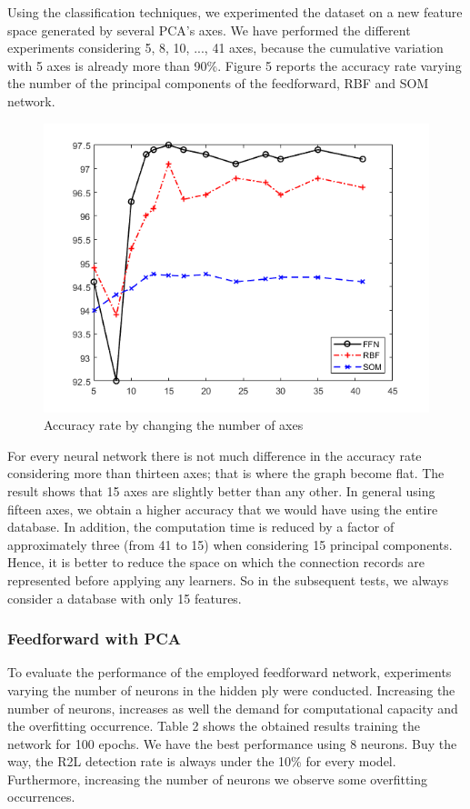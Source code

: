 \documentclass[twocolumn,11pt]{asme2ej}
\begin{document}
Using the classification techniques, we experimented the dataset on a new feature space generated by several PCA's axes. We have performed the different experiments considering 5, 8, 10, ..., 41 axes, because the cumulative variation with 5 axes is already more than 90\%. Figure 5 reports the accuracy rate varying the number of the principal components of the feedforward, RBF and SOM network.
\begin{figure}[h]
\centering
\includegraphics[scale=0.52]{PCA_RBF.png}
\caption{Accuracy rate by changing the number of axes}
\end{figure}
For every neural network there is not much difference in the accuracy rate considering more than thirteen axes; that is where the graph become flat. The result shows that 15 axes are slightly better than any other. In general using fifteen axes, we obtain a higher accuracy that we would have using the entire database. In addition, the computation time is reduced by a factor of approximately three (from 41 to 15) when considering 15 principal components. Hence, it is better to reduce the space on which the connection records are represented before applying any learners. So in the subsequent tests, we always consider a database with only 15 features.


\subsubsection{Feedforward with PCA}

To evaluate the performance of the employed feedforward network, experiments varying the number of neurons in the hidden ply were conducted. Increasing the number of neurons, increases as well the demand for computational capacity and the overfitting occurrence. Table 2 shows the obtained results training the network for 100 epochs. We have the best performance using 8 neurons. Buy the way, the R2L detection rate is always under the 10\% for every model. Furthermore, increasing the number of neurons we observe some overfitting occurrences. 
\end{document}
